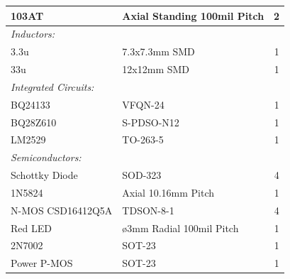 \begin{tabular}{|l|l|c|}
	103AT & Axial Standing 100mil Pitch & 2 \\
	\hline 
	\emph{Inductors:} & & \\
	\hline
	3.3u & 7.3x7.3mm SMD & 1 \\
	\hline
	33u & 12x12mm SMD & 1 \\
	\hline
	\emph{Integrated Circuits:} & & \\
	\hline
	BQ24133 & VFQN-24 & 1 \\
	\hline
	BQ28Z610 & S-PDSO-N12 & 1 \\
	\hline
	LM2529 & TO-263-5 & 1 \\
	\hline
	\emph{Semiconductors:} & & \\
	\hline
	Schottky Diode & SOD-323 & 4 \\
	\hline
	1N5824 & Axial 10.16mm Pitch & 1 \\
	\hline
	N-MOS CSD16412Q5A & TDSON-8-1 & 4 \\
	\hline
	Red LED & ø3mm Radial 100mil Pitch & 1 \\
	\hline
	2N7002 & SOT-23 & 1 \\
	\hline
	Power P-MOS & SOT-23 & 1 \\
	\hline
\end{tabular}
